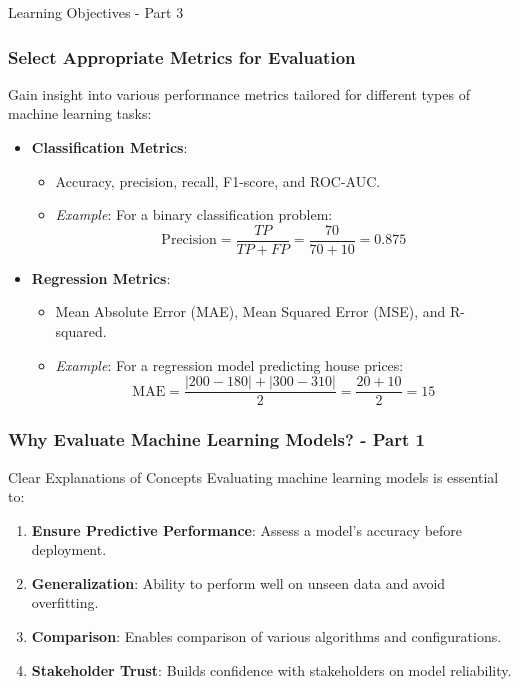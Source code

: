 \documentclass[aspectratio=169]{beamer}
\begin{document}
\begin{frame}[fragile]{Learning Objectives - Part 3}
    \frametitle{Select Appropriate Metrics for Evaluation}
    
    Gain insight into various performance metrics tailored for different types of machine learning tasks:
    
    \begin{itemize}
        \item \textbf{Classification Metrics}:
        \begin{itemize}
            \item Accuracy, precision, recall, F1-score, and ROC-AUC.
            \item \textit{Example}: For a binary classification problem:
            \begin{equation}
                \text{Precision} = \frac{TP}{TP + FP} = \frac{70}{70 + 10} = 0.875
            \end{equation}
        \end{itemize}
        
        \item \textbf{Regression Metrics}:
        \begin{itemize}
            \item Mean Absolute Error (MAE), Mean Squared Error (MSE), and R-squared.
            \item \textit{Example}: For a regression model predicting house prices:
            \begin{equation}
                \text{MAE} = \frac{|200 - 180| + |300 - 310|}{2} = \frac{20 + 10}{2} = 15
            \end{equation}
        \end{itemize}
    \end{itemize}
\end{frame}

\begin{frame}[fragile]
    \frametitle{Why Evaluate Machine Learning Models? - Part 1}
    \begin{block}{Clear Explanations of Concepts}
        Evaluating machine learning models is essential to:
    \end{block}
    \begin{enumerate}
        \item \textbf{Ensure Predictive Performance}: Assess a model's accuracy before deployment.
        \item \textbf{Generalization}: Ability to perform well on unseen data and avoid overfitting.
        \item \textbf{Comparison}: Enables comparison of various algorithms and configurations.
        \item \textbf{Stakeholder Trust}: Builds confidence with stakeholders on model reliability.
    \end{enumerate}
\end{frame}
\end{document}

